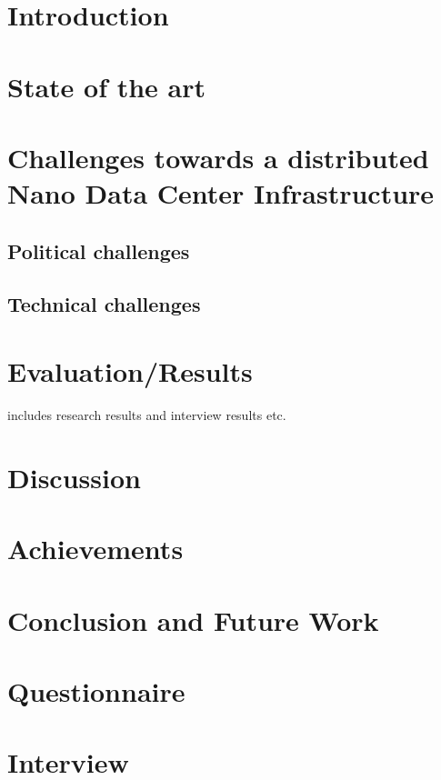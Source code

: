 
\section{Introduction}


\section{State of the art}


\section{Challenges towards a distributed Nano Data Center Infrastructure}



\subsection{Political challenges}

\subsection{Technical challenges}


\section{Evaluation/Results}

includes research results and interview results etc.

\section{Discussion}

\section{Achievements}

\section{Conclusion and Future Work}

\begin{acks}

\end{acks}




\appendix
\section{Questionnaire}

\section{Interview}
